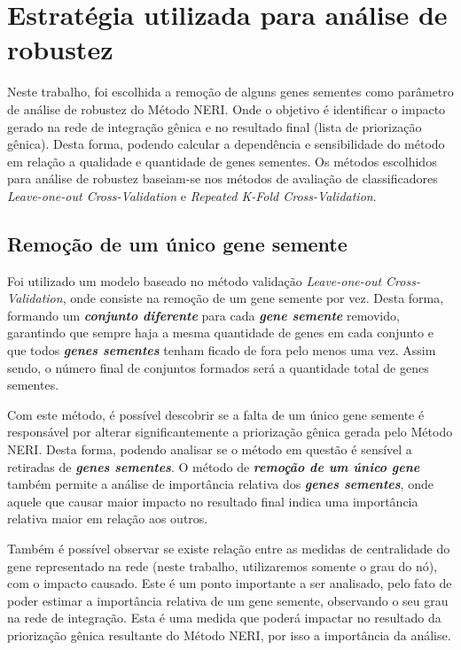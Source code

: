 \section{Estratégia utilizada para análise de robustez}

%
Neste trabalho, foi escolhida a remoção de alguns genes sementes como parâmetro de análise de robustez do Método NERI. Onde o objetivo é identificar o impacto gerado na rede de integração gênica e no resultado final (lista de priorização gênica). Desta forma, podendo calcular a dependência e sensibilidade do método em relação a qualidade e quantidade de genes sementes.
%
Os métodos escolhidos para análise de robustez baseiam-se nos métodos de avaliação de classificadores \textit{Leave-one-out Cross-Validation} e \textit{Repeated K-Fold Cross-Validation}.


\subsection{Remoção de um único gene semente}

Foi utilizado um modelo baseado no método validação \textsl{Leave-one-out Cross-Validation}, onde consiste na remoção de um gene semente por vez. Desta forma, formando um \textsl{\textbf{conjunto diferente}} para cada \textsl{\textbf{gene semente}} removido, garantindo que sempre haja a mesma quantidade de genes em cada conjunto e que todos \textsl{\textbf{genes sementes}} tenham ficado de fora pelo menos uma vez. Assim sendo, o número final de conjuntos formados será a quantidade total de genes sementes.

%
Com este método, é possível descobrir se a falta de um único gene semente é responsável por alterar significantemente a priorização gênica gerada pelo Método NERI. Desta forma, podendo analisar se o método em questão é sensível a retiradas de \textsl{\textbf{genes sementes}}. 
O método de \textsl{\textbf{remoção de um único gene}} também permite a análise de importância relativa dos \textsl{\textbf{genes sementes}}, onde aquele que causar maior impacto no resultado final indica uma importância relativa maior em relação aos outros. 

%
Também é possível observar se existe relação entre as medidas de centralidade do gene representado na rede (neste trabalho, utilizaremos somente o grau do nó), com o impacto causado. Este é um ponto importante a ser analisado, pelo fato de poder estimar a importância relativa de um gene semente, observando o seu grau na rede de integração. Esta é uma medida que poderá impactar no resultado da priorização gênica resultante do Método NERI, por isso a importância da análise.


